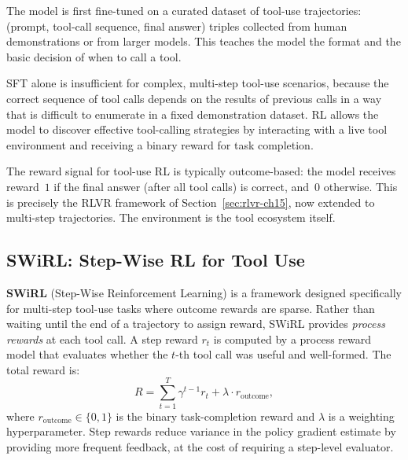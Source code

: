 \begin{description}[leftmargin=!,labelwidth=3.5cm]
\item[SFT on demonstrations] The model is first fine-tuned on a
  curated dataset of tool-use trajectories: (prompt, tool-call
  sequence, final answer) triples collected from human demonstrations
  or from larger models. This teaches the model the format and the
  basic decision of when to call a tool.

\item[RL for multi-step tool use] SFT alone is insufficient for
  complex, multi-step tool-use scenarios, because the correct sequence
  of tool calls depends on the results of previous calls in a way that
  is difficult to enumerate in a fixed demonstration dataset. RL allows
  the model to discover effective tool-calling strategies by
  interacting with a live tool environment and receiving a binary
  reward for task completion.
\end{description}

The reward signal for tool-use RL is typically outcome-based: the
model receives reward~$1$ if the final answer (after all tool calls)
is correct, and~$0$ otherwise. This is precisely the RLVR framework
of Section~\ref{sec:rlvr-ch15}, now extended to multi-step trajectories.
The environment is the tool ecosystem itself.

\subsection{SWiRL: Step-Wise RL for Tool Use}
\label{subsec:swirl}

\textbf{SWiRL} (Step-Wise Reinforcement Learning) is a framework
designed specifically for multi-step tool-use tasks where outcome
rewards are sparse. Rather than waiting until the end of a trajectory
to assign reward, SWiRL provides \emph{process rewards} at each tool
call. A step reward $r_t$ is computed by a process reward model that
evaluates whether the $t$-th tool call was useful and well-formed.
The total reward is:
\begin{equation}
\label{eq:swirl-reward}
R = \sum_{t=1}^{T} \gamma^{t-1} r_t + \lambda \cdot r_{\mathrm{outcome}},
\end{equation}
where $r_{\mathrm{outcome}} \in \{0, 1\}$ is the binary task-completion
reward and $\lambda$ is a weighting hyperparameter. Step rewards
reduce variance in the policy gradient estimate by providing more
frequent feedback, at the cost of requiring a step-level evaluator.

